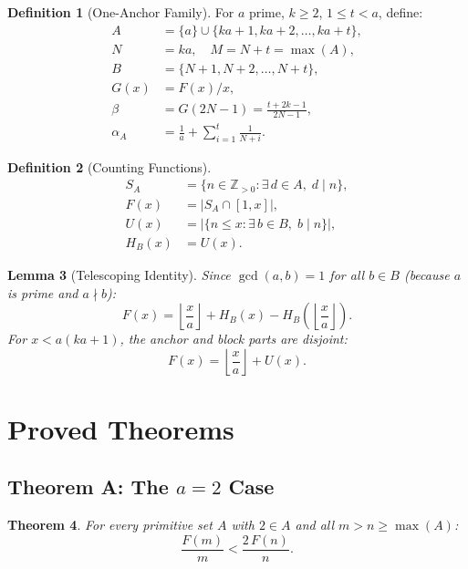 \documentclass[11pt,a4paper]{article}
\newtheorem{theorem}{Theorem}[section]
\newtheorem{lemma}[theorem]{Lemma}
\theoremstyle{definition}
\newtheorem{definition}[theorem]{Definition}
\newcommand{\floor}[1]{\left\lfloor #1 \right\rfloor}
\begin{document}
\begin{definition}[One-Anchor Family]
For $a$ prime, $k \geq 2$, $1 \leq t < a$, define:
\begin{align}
A &= \{a\} \cup \{ka+1, ka+2, \ldots, ka+t\}, \\
N &= ka, \quad M = N + t = \max(A), \\
B &= \{N+1, N+2, \ldots, N+t\}, \\
G(x) &= F(x)/x, \\
\beta &= G(2N-1) = \frac{t + 2k - 1}{2N - 1}, \\
\alpha_A &= \frac{1}{a} + \sum_{i=1}^{t} \frac{1}{N+i}.
\end{align}
\end{definition}

\begin{definition}[Counting Functions]
\begin{align}
S_A &= \{n \in \mathbb{Z}_{>0} : \exists\, d \in A,\; d \mid n\}, \\
F(x) &= |S_A \cap [1,x]|, \\
U(x) &= |\{n \leq x : \exists\, b \in B,\; b \mid n\}|, \\
H_B(x) &= U(x).
\end{align}
\end{definition}

\begin{lemma}[Telescoping Identity]
Since $\gcd(a,b) = 1$ for all $b \in B$ (because $a$ is prime and 
$a \nmid b$):
\[
F(x) = \floor{\frac{x}{a}} + H_B(x) - H_B\!\left(\floor{\frac{x}{a}}\right).
\]
For $x < a(ka+1)$, the anchor and block parts are disjoint:
\[
F(x) = \floor{\frac{x}{a}} + U(x).
\]
\end{lemma}

\section{Proved Theorems}

\subsection{Theorem A: The $a=2$ Case}

\begin{theorem}\label{thm:a2}
For every primitive set $A$ with $2 \in A$ and all $m > n \geq \max(A)$:
\[
\frac{F(m)}{m} < \frac{2\,F(n)}{n}.
\]
\end{theorem}
\end{document}

